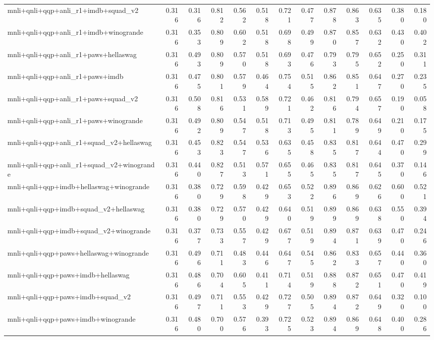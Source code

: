 \begin{table}[t]
\begin{tabular}{lrrrrrrrrrrrr}
    mnli+qnli+qqp+anli\_r1+imdb+squad\_v2 & 0.316 & 0.316 & 0.812 & 0.562 & 0.518 & 0.721 & 0.477 & 0.878 & 0.863 & 0.635 & 0.380 & 0.180 \\
    mnli+qnli+qqp+anli\_r1+imdb+winogrande & 0.316 & 0.353 & 0.809 & 0.602 & 0.518 & 0.698 & 0.499 & 0.870 & 0.857 & 0.632 & 0.430 & 0.402 \\
    mnli+qnli+qqp+anli\_r1+paws+hellaswag & 0.316 & 0.493 & 0.809 & 0.570 & 0.518 & 0.693 & 0.476 & 0.793 & 0.795 & 0.652 & 0.250 & 0.311 \\
    mnli+qnli+qqp+anli\_r1+paws+imdb & 0.316 & 0.475 & 0.801 & 0.579 & 0.464 & 0.754 & 0.515 & 0.862 & 0.851 & 0.647 & 0.270 & 0.235 \\
    mnli+qnli+qqp+anli\_r1+paws+squad\_v2 & 0.316 & 0.508 & 0.816 & 0.531 & 0.589 & 0.721 & 0.462 & 0.816 & 0.794 & 0.657 & 0.190 & 0.058 \\
    mnli+qnli+qqp+anli\_r1+paws+winogrande & 0.316 & 0.492 & 0.809 & 0.547 & 0.518 & 0.713 & 0.495 & 0.811 & 0.789 & 0.649 & 0.210 & 0.175 \\
    mnli+qnli+qqp+anli\_r1+squad\_v2+hellaswag & 0.316 & 0.453 & 0.823 & 0.547 & 0.536 & 0.635 & 0.458 & 0.835 & 0.817 & 0.644 & 0.470 & 0.299 \\
    mnli+qnli+qqp+anli\_r1+squad\_v2+winogrande & 0.316 & 0.440 & 0.827 & 0.513 & 0.571 & 0.655 & 0.465 & 0.835 & 0.817 & 0.645 & 0.370 & 0.146 \\
    mnli+qnli+qqp+imdb+hellaswag+winogrande & 0.316 & 0.380 & 0.729 & 0.598 & 0.429 & 0.653 & 0.522 & 0.896 & 0.869 & 0.626 & 0.600 & 0.521 \\
    mnli+qnli+qqp+imdb+squad\_v2+hellaswag & 0.316 & 0.380 & 0.729 & 0.570 & 0.429 & 0.640 & 0.519 & 0.899 & 0.869 & 0.638 & 0.550 & 0.394 \\
    mnli+qnli+qqp+imdb+squad\_v2+winogrande & 0.316 & 0.377 & 0.733 & 0.557 & 0.429 & 0.677 & 0.519 & 0.894 & 0.871 & 0.639 & 0.470 & 0.246 \\
    mnli+qnli+qqp+paws+hellaswag+winogrande & 0.316 & 0.496 & 0.711 & 0.483 & 0.446 & 0.647 & 0.545 & 0.862 & 0.833 & 0.657 & 0.440 & 0.360 \\
    mnli+qnli+qqp+paws+imdb+hellaswag & 0.316 & 0.486 & 0.704 & 0.605 & 0.411 & 0.714 & 0.519 & 0.888 & 0.872 & 0.651 & 0.470 & 0.419 \\
    mnli+qnli+qqp+paws+imdb+squad\_v2 & 0.316 & 0.497 & 0.711 & 0.553 & 0.429 & 0.727 & 0.505 & 0.894 & 0.872 & 0.649 & 0.320 & 0.100 \\
    mnli+qnli+qqp+paws+imdb+winogrande & 0.316 & 0.480 & 0.700 & 0.576 & 0.393 & 0.725 & 0.523 & 0.894 & 0.869 & 0.648 & 0.400 & 0.286 \\

\end{tabular}
\end{table}
